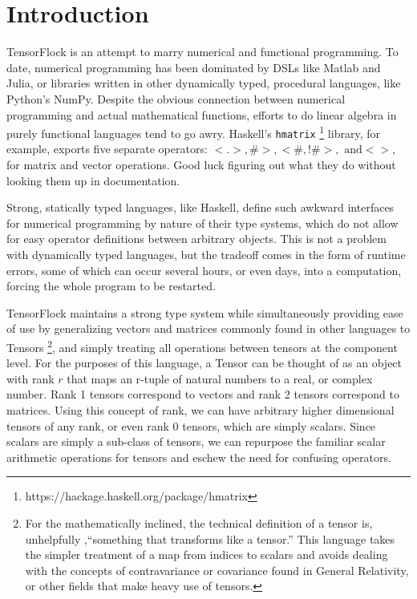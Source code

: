 \section{Introduction}%
\label{sec:introduction}

TensorFlock is an attempt to marry numerical and functional programming.
To date, numerical programming has been dominated by DSLs like Matlab and
Julia, or libraries written in other dynamically typed, procedural languages,
like Python's NumPy. Despite the obvious connection between numerical
programming and actual mathematical functions, efforts to do linear algebra in
purely functional languages tend to go awry. Haskell's \verb|hmatrix|
\footnote{https://hackage.haskell.org/package/hmatrix}  
library, for example, exports five separate operators: $<.>, \#>, <\#, !\#>, \text{ and} <>$, 
for matrix and vector operations. Good luck figuring out what they do without
looking them up in documentation.

Strong, statically typed languages, like Haskell, define such awkward interfaces for numerical 
programming by nature of their type systems, which do not allow for easy operator 
definitions between arbitrary objects. This is not a problem with
dynamically typed languages, but the tradeoff comes in the form of runtime
errors, some of which can occur several hours, or even days, into
a computation, forcing the whole program to be restarted.

TensorFlock maintains a strong type system while simultaneously providing
ease of use by generalizing vectors and matrices commonly found in other
languages to Tensors 
\footnote{For the mathematically inclined, the technical definition of a tensor is, unhelpfully
,``something that transforms like a tensor.'' This language takes the simpler
treatment of a map from indices to scalars and avoids dealing with the concepts
of contravariance or covariance found in General Relativity, or other fields
that make heavy use of tensors.},
and simply treating all operations between tensors at the component level. 
For the purposes of this language, a Tensor
can be thought of as an object with rank $r$ that
maps an r-tuple of natural numbers to a real, or complex number. Rank 1 tensors
correspond to vectors and rank 2 tensors correspond to matrices. Using this
concept of rank, we can have arbitrary higher dimensional tensors of any rank,
or even rank 0 tensors, which are simply scalars. Since scalars are simply
a sub-class of tensors, we can repurpose the familiar scalar arithmetic
operations for tensors and eschew the need for confusing operators.

